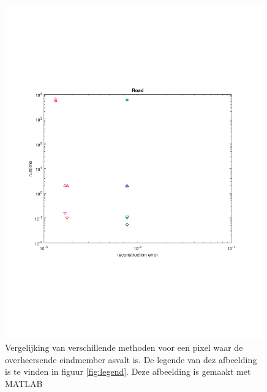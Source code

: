 \documentclass[12pt]{report}
\begin{document}
\begin{figure}
\includegraphics[width=0.99\textwidth,trim=0 200 0 175 cm]{plot_road.pdf}
\caption{Vergelijking van verschillende methoden voor een pixel waar de overheersende eindmember asvalt is. De legende van dez afbeelding is te vinden in figuur \ref{fig:legend}. Deze afbeelding is gemaakt met MATLAB\cite{matlab} \label{fig:road}}
\end{figure}
\end{document}

